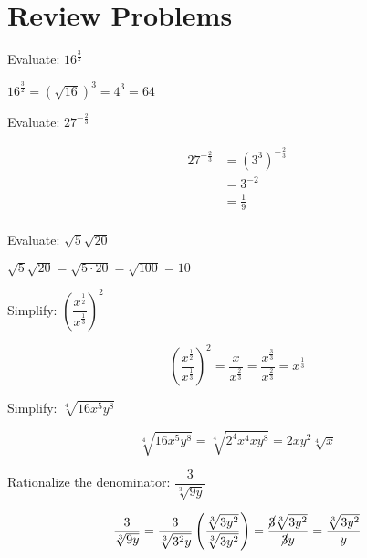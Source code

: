 \documentclass[fleqn,addpoints]{exam}
\begin{document}
\fi


\section{Review Problems}

\begin{questions}
\question 
Evaluate: $16^{\frac{3}{2}}$

\begin{solution}
  $16^{\frac{3}{2}} = (\sqrt{16})^3 = 4^3 = 64$
\end{solution}

\question 
Evaluate: $27^{-\frac{2}{3}}$

\begin{solution}

\begin{align*}
  27^{-\frac{2}{3}} &= (3^3)^{-\frac{2}{3}} \\
  &= 3^{-2} \\
  &= \frac{1}{9} \\
\end{align*}
\end{solution}

\question 
Evaluate: $\sqrt{5} \sqrt{20}$
\begin{solution}
  $\sqrt{5} \sqrt{20} = \sqrt{5 \cdot 20} = \sqrt{100} = 10$
\end{solution}

\question 
Simplify: $\left( \dfrac{x^{\frac{1}{2}}}{x^{\frac{1}{3}}} \right)^2$

\begin{solution}
\[
  \left( \frac{x^{\frac{1}{2}}}{x^{\frac{1}{3}}} \right)^2
  = \frac{x}{x^{\frac{2}{3}}}
  = \frac{x^{\frac{3}{3}}}{x^{\frac{2}{3}}}
  = x^{\frac{1}{3}}
\]
\end{solution}

\question 
Simplify: $\sqrt[4]{16x^5y^8}$
\begin{solution}
\[
  \sqrt[4]{16x^5y^8} = \sqrt[4]{2^4x^4xy^8} = 2xy^2\sqrt[4]{x}
\]

\end{solution}

\question
Rationalize the denominator: $\dfrac{3}{\sqrt[3]{9y}}$
\begin{solution}
\[
  \frac{3}{\sqrt[3]{9y}} = \frac{3}{\sqrt[3]{3^2y}} \left( \frac{\sqrt[3]{3y^2}}{\sqrt[3]{3y^2}} \right)
  = \frac{\cancel{3} \sqrt[3]{3y^2}}{\cancel{3}y}
  = \frac{\sqrt[3]{3y^2}}{y}
\]
\end{solution}


\end{questions}
\end{document}
